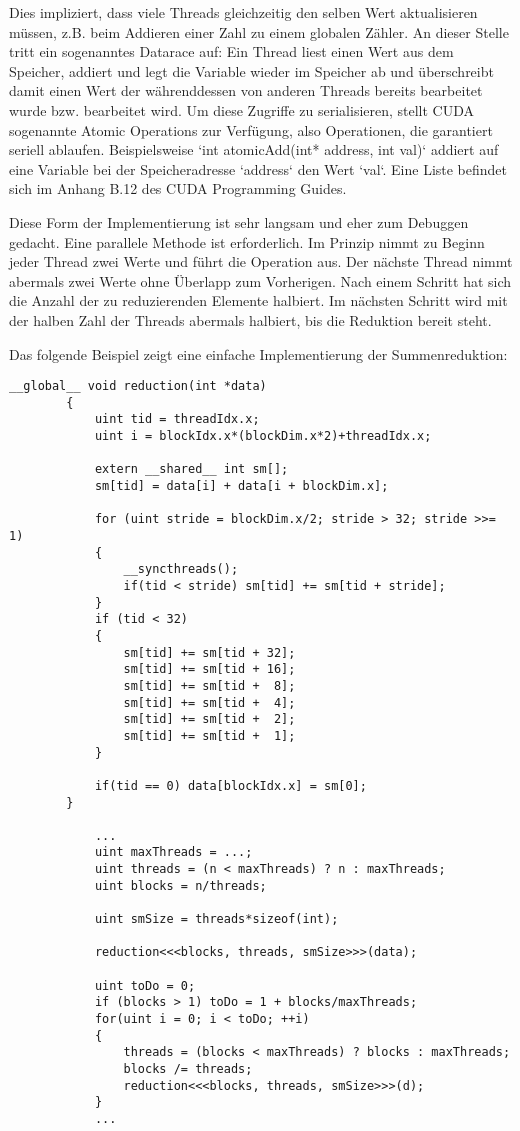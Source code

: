 		Dies impliziert, dass viele \Glspl{Thread} gleichzeitig den selben Wert aktualisieren müssen, z.B. beim Addieren einer Zahl zu einem globalen Zähler. An dieser Stelle tritt ein sogenanntes Datarace auf: Ein \Gls{Thread} liest einen Wert aus dem Speicher, addiert und legt die Variable wieder im Speicher ab und überschreibt damit einen Wert der währenddessen von anderen \Glspl{Thread} bereits bearbeitet wurde bzw. bearbeitet wird. Um diese Zugriffe zu serialisieren, stellt CUDA sogenannte Atomic Operations zur Verfügung, also Operationen, die garantiert seriell ablaufen. Beispielsweise \li`int atomicAdd(int* address, int val)` addiert auf eine Variable bei der Speicheradresse \li`address` den Wert \li`val`. Eine Liste befindet sich im Anhang B.12 des CUDA Programming Guides. \autocite{cudaPG}
		
		Diese Form der Implementierung ist sehr langsam und eher zum Debuggen gedacht. Eine parallele Methode ist erforderlich. Im Prinzip nimmt zu Beginn jeder \Gls{Thread} zwei Werte und führt die Operation aus. Der nächste \Gls{Thread} nimmt abermals zwei Werte ohne Überlapp zum Vorherigen. Nach einem Schritt hat sich die Anzahl der zu reduzierenden Elemente halbiert. Im nächsten Schritt wird mit der halben Zahl der \Glspl{Thread} abermals halbiert, bis die Reduktion bereit steht.
		
		Das folgende Beispiel zeigt eine einfache Implementierung der Summenreduktion:
		
		\begin{lstlisting}[caption=Reduktion]		
		__global__ void reduction(int *data)
		{
			uint tid = threadIdx.x;
			uint i = blockIdx.x*(blockDim.x*2)+threadIdx.x;

			extern __shared__ int sm[]; 
			sm[tid] = data[i] + data[i + blockDim.x];
  
			for (uint stride = blockDim.x/2; stride > 32; stride >>= 1)
			{
				__syncthreads();
				if(tid < stride) sm[tid] += sm[tid + stride];
			}
			if (tid < 32)
  			{
				sm[tid] += sm[tid + 32];
				sm[tid] += sm[tid + 16];
				sm[tid] += sm[tid +  8];
				sm[tid] += sm[tid +  4];
				sm[tid] += sm[tid +  2];
				sm[tid] += sm[tid +  1];
			}
  
			if(tid == 0) data[blockIdx.x] = sm[0];
		}
		
			...
			uint maxThreads = ...;
			uint threads = (n < maxThreads) ? n : maxThreads;
			uint blocks = n/threads;

			uint smSize = threads*sizeof(int);

			reduction<<<blocks, threads, smSize>>>(data);  

			uint toDo = 0;
			if (blocks > 1) toDo = 1 + blocks/maxThreads;
			for(uint i = 0; i < toDo; ++i)
			{
				threads = (blocks < maxThreads) ? blocks : maxThreads;
				blocks /= threads;
				reduction<<<blocks, threads, smSize>>>(d);
			}
			...
		\end{lstlisting}
		
